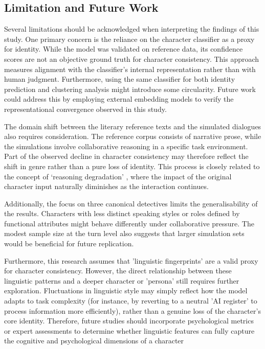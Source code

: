 \documentclass{article}
\begin{document}
\subsection{Limitation and Future Work}

Several limitations should be acknowledged when interpreting the findings of this study. One primary concern is the reliance on the character classifier as a proxy for identity. While the model was validated on reference data, its confidence scores are not an objective ground truth for character consistency. This approach measures alignment with the classifier’s internal representation rather than with human judgment. Furthermore, using the same classifier for both identity prediction and clustering analysis might introduce some circularity. Future work could address this by employing external embedding models to verify the representational convergence observed in this study.

The domain shift between the literary reference texts and the simulated dialogues also requires consideration. The reference corpus consists of narrative prose, while the simulations involve collaborative reasoning in a specific task environment. Part of the observed decline in character consistency may therefore reflect the shift in genre rather than a pure loss of identity. This process is closely related to the concept of ‘reasoning degradation’ \citep{xiao2023simulating}, where the impact of the original character input naturally diminishes as the interaction continues.

Additionally, the focus on three canonical detectives limits the generalisability of the results. Characters with less distinct speaking styles or roles defined by functional attributes might behave differently under collaborative pressure. The modest sample size at the turn level also suggests that larger simulation sets would be beneficial for future replication.

Furthermore, this research assumes that 'linguistic fingerprints' are a valid proxy for character consistency. However, the direct relationship between these linguistic patterns and a deeper character or 'persona' still requires further exploration. Fluctuations in linguistic style may simply reflect how the model adapts to task complexity (for instance, by reverting to a neutral 'AI register' to process information more efficiently), rather than a genuine loss of the character's core identity. Therefore, future studies should incorporate psychological metrics or expert assessments to determine whether linguistic features can fully capture the cognitive and psychological dimensions of a character
\end{document}
